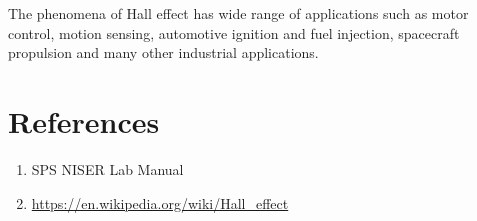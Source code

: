 \documentclass[a4paper, amsfonts, amssymb, amsmath, reprint, showkeys, nofootinbib, twoside]{revtex4-1}
\begin{document}
The phenomena of Hall effect has wide range of applications such as motor control, motion sensing, automotive ignition and fuel injection, spacecraft propulsion and many other industrial applications.

\section{References}
\begin{enumerate}
\item{SPS NISER Lab Manual}
\item {\url{https://en.wikipedia.org/wiki/Hall_effect}}


\end{enumerate}
\end{document}
